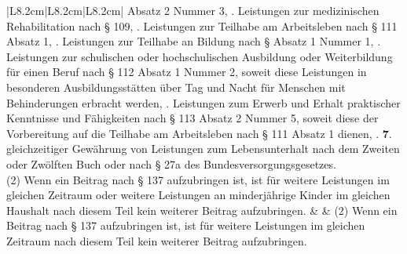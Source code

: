 \documentclass[10pt,a4paper,landscape]{article}
\begin{document}
\begin{longtable}{|L{8.2cm}|L{8.2cm}|L{8.2cm}|}
Absatz 2 Nummer 3,  .  \newline Leistungen zur medizinischen  \newline Rehabilitation nach \S{} 109,  .  \newline Leistungen zur Teilhabe am Arbeitsleben  \newline nach \S{} 111 Absatz 1,  .  \newline Leistungen zur Teilhabe an Bildung nach \S{}   Absatz 1 Nummer 1,  .  \newline Leistungen zur schulischen oder  \newline hochschulischen Ausbildung oder  \newline Weiterbildung für einen Beruf nach \S{} 112  \newline Absatz 1 Nummer 2, soweit diese  \newline Leistungen in besonderen  \newline Ausbildungsstätten über Tag und Nacht für  \newline Menschen mit Behinderungen erbracht  \newline werden,  .  \newline Leistungen zum Erwerb und Erhalt  \newline praktischer Kenntnisse und Fähigkeiten  \newline nach \S{} 113 Absatz 2 Nummer 5, soweit  \newline diese der Vorbereitung auf die Teilhabe am  \newline Arbeitsleben nach \S{} 111 Absatz 1 dienen,  .  \newline \textbf{\textcolor{diffgreen}{7}}\textcolor{diffgreen}{.}  \newline gleichzeitiger Gewährung von Leistungen  \newline zum Lebensunterhalt nach dem Zweiten  \newline oder Zwölften Buch oder nach \S{} 27a des  \newline Bundesversorgungsgesetzes. \\
\hhline{|---|}
(2) Wenn ein Beitrag nach \S{} 137  \newline aufzubringen ist, ist für weitere Leistungen  \newline im gleichen Zeitraum \textcolor{diffred}{oder weitere  \newline Leistungen an minderjährige Kinder im  \newline gleichen Haushalt} nach diesem Teil kein  \newline weiterer Beitrag aufzubringen. &  & (2) Wenn ein Beitrag nach \S{} 137  \newline aufzubringen ist, ist für weitere Leistungen  \newline im gleichen Zeitraum  nach diesem Teil kein  \newline weiterer Beitrag aufzubringen. \\

\end{longtable}
\end{document}
